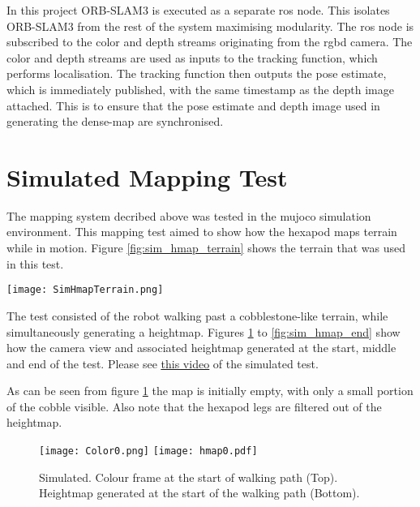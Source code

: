     In this project ORB-SLAM3 is executed as a separate \ac{ros} node. This isolates ORB-SLAM3 from the rest of the system maximising modularity. The \ac{ros} node is subscribed to the color and depth streams originating from the \ac{rgbd} camera. The color and depth streams are used as inputs to the tracking function, which performs localisation. The tracking function then outputs the pose estimate, which is immediately published, with the same timestamp as the depth image attached. This is to ensure that the pose estimate and depth image used in generating the dense-map are synchronised.

    \section{Simulated Mapping Test}\label{sec:sim_hmap}
        The mapping system decribed above was tested in the \ac{mujoco} simulation environment. This mapping test aimed to show how the hexapod maps terrain while in motion. Figure \ref{fig:sim_hmap_terrain} shows the terrain that was used in this test.
        \vspace{0.5cm}
        
        \begin{centering}
            \texttt{[image: SimHmapTerrain.png]}
            \label{fig:sim_hmap_terrain}
        \end{centering}
        
        \noindent
        The test consisted of the robot walking past a cobblestone-like terrain, while simultaneously generating a heightmap. Figures \ref{fig:sim_hmap_start} to \ref{fig:sim_hmap_end} show how the camera view and associated heightmap generated at the start, middle and end of the test. Please see \href{https://youtu.be/EgFnK6jmhdc}{\color{blue}\underline{this video}} of the simulated test.

        As can be seen from figure \ref{fig:sim_hmap_start} the map is initially empty, with only a small portion of the cobble visible. Also note that the hexapod legs are filtered out of the heightmap.
        \begin{figure}[h]
            \centering
            \texttt{[image: Color0.png]}
            \texttt{[image: hmap0.pdf]}
            \caption{Simulated. Colour frame at the start of walking path (Top). Heightmap generated at the start of the walking path (Bottom).}
            \label{fig:sim_hmap_start}
        \end{figure}

